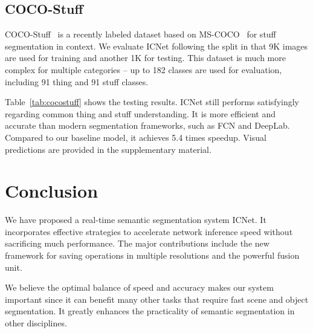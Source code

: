 \documentclass[runningheads]{llncs}
\begin{document}
\subsection{COCO-Stuff}
COCO-Stuff~\cite{caesar2016coco} is a recently labeled dataset based on MS-COCO~\cite{lin2014microsoft} for stuff segmentation in context. We evaluate ICNet following the split in \cite{caesar2016coco} that 9K images are used for training and another 1K for testing. This dataset is much more complex for multiple categories -- up to 182 classes are used for evaluation, including 91 thing and 91 stuff classes.

Table~\ref{tab:cocostuff} shows the testing results. ICNet still performs satisfyingly regarding common thing and stuff understanding. It is more efficient and accurate than modern segmentation frameworks, such as FCN and DeepLab. Compared to our baseline model, it achieves 5.4 times speedup. Visual predictions are provided in the supplementary material.

\section{Conclusion}
We have proposed a real-time semantic segmentation system ICNet. It incorporates effective strategies to accelerate network inference speed without sacrificing much performance. The major contributions include the new framework for saving operations in multiple resolutions and the powerful fusion unit.

We believe the optimal balance of speed and accuracy makes our system important since it can benefit many other tasks that require fast scene and object segmentation. It greatly enhances the practicality of semantic segmentation in other disciplines.

\clearpage



%
\end{document}
